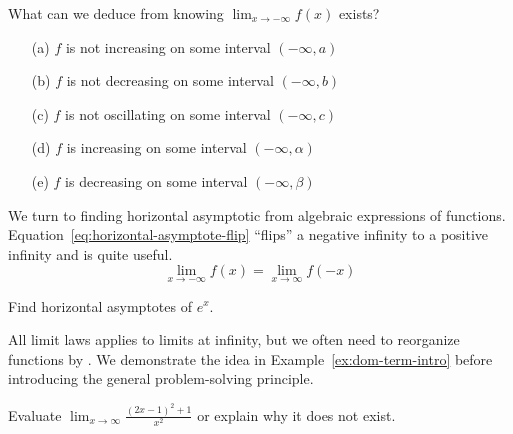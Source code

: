 \documentclass[../main.tex]{subfiles}
\begin{document}
  \bigskip

  \begin{example}
    What can we deduce from knowing \(\lim_{x \to -\infty} f(x)\) exists? 

    \begin{itemize}
      \item[(a)] \(f\) is not increasing on some interval \((-\infty, a)\)
      \item[(b)] \(f\) is not decreasing on some interval \((-\infty, b)\)
      \item[(c)] \(f\) is not oscillating on some interval \((-\infty, c)\)
      \item[(d)] \(f\) is increasing on some interval \((-\infty, \alpha)\)
      \item[(e)] \(f\) is decreasing on some interval \((-\infty, \beta)\)
    \end{itemize} 
  \end{example}
  \clearpage

  We turn to finding horizontal asymptotic from algebraic expressions of functions. Equation~\eqref{eq:horizontal-asymptote-flip} ``flips'' a negative infinity to a positive infinity and is quite useful.
  \begin{equation} \label{eq:horizontal-asymptote-flip}
    \lim_{x \to -\infty} f(x) = \lim_{x \to \infty} f(-x)
  \end{equation}
  \begin{center}
    \hfill{}
    
    \hfill{}
    
    \hfill{}
  \end{center}

  \begin{example}
    Find horizontal asymptotes of \(e^{x}\).

  \end{example}

  All limit laws applies to limits at infinity, but we often need to reorganize functions by . We demonstrate the idea in Example~\ref{ex:dom-term-intro} before introducing the general problem-solving principle.

  \begin{example}\label{ex:dom-term-intro}
    Evaluate \(\lim_{x \to \infty} \frac{(2x-1)^{2} + 1}{x^{2}}\) or explain why it does not exist.

  \end{example}
  \clearpage
\end{document}
